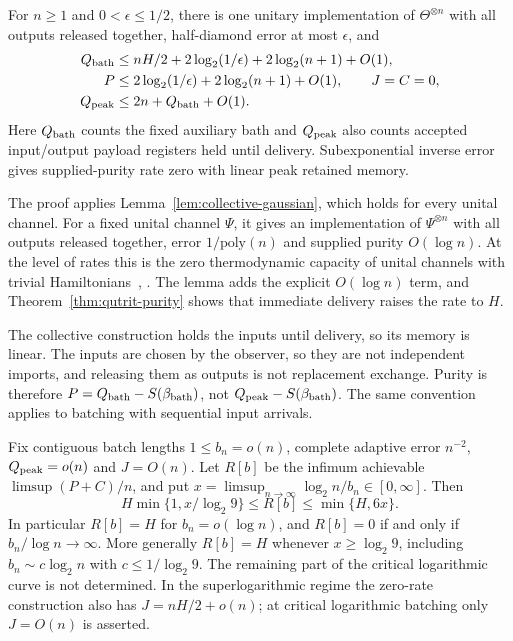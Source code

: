 \begin{theorem}\label{thm:qutrit-collective}
For $n\geq1$ and $0<\epsilon\leq1/2$, there is one unitary
implementation of $\Theta^{\otimes n}$ with all outputs released
together, half-diamond error at most $\epsilon$, and
\begin{align*}
 Q_{\rm bath}&\leq nH/2+2\log_2(1/\epsilon)+2\log_2(n+1)+O(1),\\
 P&\leq2\log_2(1/\epsilon)+2\log_2(n+1)+O(1),\qquad J=C=0,\\
 Q_{\rm peak}&\leq2n+Q_{\rm bath}+O(1).
\end{align*}
Here $Q_{\rm bath}$ counts the fixed auxiliary bath and
$Q_{\rm peak}$ also counts accepted input/output payload registers
held until delivery. Subexponential inverse error gives
supplied-purity rate zero with linear peak retained memory.
\end{theorem}

The proof applies Lemma~\ref{lem:collective-gaussian}, which holds
for every unital channel. For a fixed unital channel $\Psi$, it gives
an implementation of $\Psi^{\otimes n}$ with all outputs released
together, error $1/\mathrm{poly}(n)$ and supplied purity $O(\log n)$.
At the level of rates this is the zero thermodynamic capacity of
unital channels with trivial Hamiltonians~\cite{FaistBertaBrandao2019},
\cite[Equation~(4.9) and Theorem~7.1]{FaistBertaBrandao2021}. The lemma
adds the explicit $O(\log n)$ term, and Theorem~\ref{thm:qutrit-purity}
shows that immediate delivery raises the rate to $H$.

The collective construction holds the inputs until delivery, so its
memory is linear. The inputs are chosen by the observer, so they are
not independent imports, and releasing them as outputs is not replacement
exchange. Purity is therefore $P=Q_{\rm bath}-S(\beta_{\rm bath})$,
not $Q_{\rm peak}-S(\beta_{\rm bath})$. The same convention applies to
batching with sequential input arrivals.

\begin{theorem}\label{thm:batch-purity}
Fix contiguous batch lengths $1\leq b_n=o(n)$, complete adaptive error
$n^{-2}$, $Q_{\rm peak}=o(n)$ and $J=O(n)$. Let $R[b]$ be the infimum achievable
$\limsup(P+C)/n$, and put
$x=\limsup_{n\to\infty}\log_2n/b_n\in[0,\infty]$. Then
\[
 H\min\{1,x/\log_2 9\}\leq R[b]\leq\min\{H,6x\}.
\]
In particular $R[b]=H$ for $b_n=o(\log n)$, and $R[b]=0$ if and
only if $b_n/\log n\to\infty$. More generally $R[b]=H$ whenever
$x\geq\log_2 9$, including $b_n\sim c\log_2n$ with
$c\leq1/\log_2 9$. The remaining part of the critical logarithmic
curve is not determined. In the superlogarithmic regime the zero-rate
construction also has $J=nH/2+o(n)$; at critical logarithmic batching
only $J=O(n)$ is asserted.
\end{theorem}

